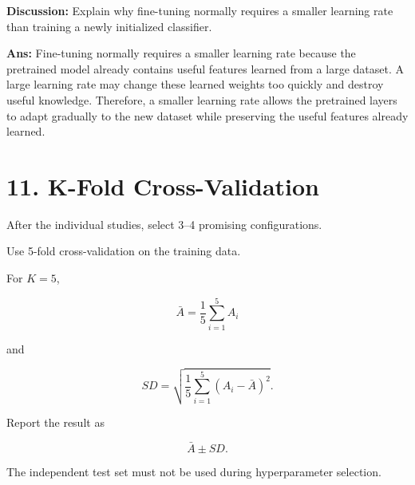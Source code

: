 \documentclass[10pt]{article}
\begin{document}

\textbf{Discussion:} Explain why fine-tuning normally requires a smaller
learning rate than training a newly initialized classifier.

\textbf{Ans:} Fine-tuning normally requires a smaller learning rate
because the pretrained model already contains useful features learned from a
large dataset. A large learning rate may change these learned weights too
quickly and destroy useful knowledge. Therefore, a smaller learning rate allows
the pretrained layers to adapt gradually to the new dataset while preserving
the useful features already learned.

\section*{11. K-Fold Cross-Validation}

After the individual studies, select 3--4 promising configurations.

Use 5-fold cross-validation on the training data.

For $K=5$,

\[
\bar{A}=
\frac{1}{5}\sum_{i=1}^{5}A_i
\]

and

\[
SD=
\sqrt{
\frac{1}{5}
\sum_{i=1}^{5}(A_i-\bar{A})^2
}.
\]

Report the result as

\[
\boxed{\bar{A}\pm SD}.
\]

The independent test set must not be used during hyperparameter selection.

\end{document}
